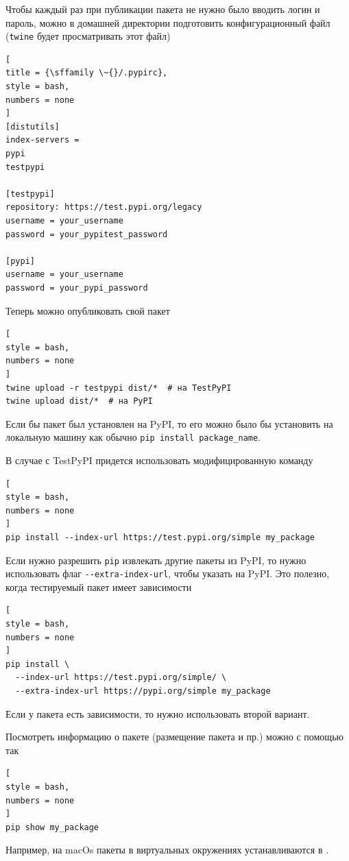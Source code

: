 \documentclass[%
	11pt,
	a4paper,
	utf8,
		]{article}
\begin{document}
Чтобы каждый раз при публикации пакета не нужно было вводить логин и пароль, можно в домашней директории подготовить конфигурационный файл (\texttt{twine} будет просматривать этот файл)
\begin{lstlisting}[
title = {\sffamily \~{}/.pypirc},
style = bash,
numbers = none	
]
[distutils]
index-servers =
pypi
testpypi

[testpypi]
repository: https://test.pypi.org/legacy
username = your_username
password = your_pypitest_password

[pypi]
username = your_username
password = your_pypi_password
\end{lstlisting}

Теперь можно опубликовать свой пакет 
\begin{lstlisting}[
style = bash,
numbers = none	
]
twine upload -r testpypi dist/*  # на TestPyPI
twine upload dist/*  # на PyPI
\end{lstlisting}

Если бы пакет был установлен на PyPI, то его можно было бы установить на локальную машину как обычно \texttt{pip install package\_name}.

В случае с TestPyPI придется использовать модифицированную команду
\begin{lstlisting}[
style = bash,
numbers = none	
]
pip install --index-url https://test.pypi.org/simple my_package
\end{lstlisting}


Если нужно разрешить \texttt{pip} извлекать другие пакеты из PyPI, то нужно использовать флаг \verb|--extra-index-url|, чтобы указать на PyPI. Это полезно, когда тестируемый пакет имеет зависимости
\begin{lstlisting}[
style = bash,
numbers = none	
]
pip install \
  --index-url https://test.pypi.org/simple/ \
  --extra-index-url https://pypi.org/simple my_package
\end{lstlisting}

Если у пакета есть зависимости, то нужно использовать второй вариант.

Посмотреть информацию о пакете (размещение пакета и пр.) можно с помощью так
\begin{lstlisting}[
style = bash,
numbers = none	
]
pip show my_package
\end{lstlisting}

Например, на macOs пакеты в виртуальных окружениях устанавливаются в .
\end{document}
